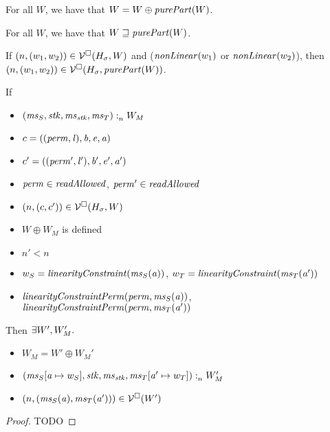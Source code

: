 \documentclass[a4paper]{article}
\begin{document}
\begin{lemma}
 For all $W$, we have that $W = W \oplus \purePart{W}$.
\end{lemma}

\begin{lemma}
  \label{lem:world-fut-purePart}
  For all $W$, we have that $W \future \purePart{W}$.
\end{lemma}

\begin{lemma}
  \label{lem:non-linear-pure}
  If $\left(n,(w_1,w_2)\right) \in \mathcal{V}^{\square}(H_\sigma,W)$ and ($\nonLinear{w_1}$ or $\nonLinear{w_2}$), then
  $\npair{(w_1,w_2)} \in \lrv(H_\sigma,\purePart{W})$.
\end{lemma}

\begin{lemma}
  \label{lem:readcond-writecond-work}
  If
  \begin{itemize}
  \item $(\mathit{ms}_S,\mathit{stk},\mathit{ms}_{\mathit{stk}},\mathit{ms}_T) :_{n}^{}W_M$
  \item $c = ((\mathit{perm},\mathit{l}),\mathit{b},\mathit{e},\mathit{a})$
  \item $c' = ((\mathit{perm}',\mathit{l}'),\mathit{b}',\mathit{e}',\mathit{a}')$
  \item $\perm \in \readAllowed{}$, $\perm' \in \readAllowed{}$
  \item $\left(n,(c,c')\right)\in\mathcal{V}^{\square}(H_\sigma,W)$
  \item $W \oplus W_M$ is defined
  \item $n' < n$
  \item $w_S = \linCons{\ms_S(\aaddr)}$, $w_T = \linCons{\ms_T(\aaddr')}$
  \item $\linConsPerm{\perm}{\ms_S(\aaddr)}$, $\linConsPerm{\perm}{\ms_T(\aaddr')}$
  \end{itemize}
  Then $\exists W', W_M'\ldotp$
  \begin{itemize}
  \item $W_M = W' \oplus W_M'$
  \item $(\mathit{ms}_S[\mathit{a} \mapsto w_S],\mathit{stk},\mathit{ms}_{\mathit{stk}},\mathit{ms}_T[\mathit{a}' \mapsto w_T]) :_{n}^{}W_M'$
  \item $\left(n,(\mathit{ms}_S(\mathit{a}),\mathit{ms}_T(\mathit{a}'))\right) \in \mathcal{V}^{\square}(W')$
  \end{itemize}
\end{lemma}
\begin{proof}
  TODO
\end{proof}
\end{document}
